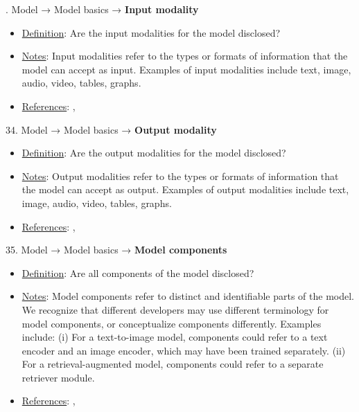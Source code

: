 . Model → Model basics → \textbf{Input modality}
\vspace{-\parskip}
\begin{itemize}
	\item
	\underline{Definition}: Are the input modalities for the model disclosed?
	\item
	\underline{Notes}: Input modalities refer to the types or formats of information that the model can accept as input. Examples of input modalities include text, image, audio, video, tables, graphs.
	\item
	\underline{References}: \citet{mitchell2019model}, \citet{crisan2022interactive}
\end{itemize} \vspace{\baselineskip}


34. Model → Model basics → \textbf{Output modality}
\vspace{-\parskip}
\begin{itemize}
	\item
	\underline{Definition}: Are the output modalities for the model disclosed?
	\item
	\underline{Notes}: Output modalities refer to the types or formats of information that the model can accept as output. Examples of output modalities include text, image, audio, video, tables, graphs.
	\item
	\underline{References}: \citet{mitchell2019model}, \citet{crisan2022interactive}
\end{itemize} \vspace{\baselineskip}


35. Model → Model basics → \textbf{Model components}
\vspace{-\parskip}
\begin{itemize}
	\item
	\underline{Definition}: Are all components of the model disclosed?
	\item
	\underline{Notes}: Model components refer to distinct and identifiable parts of the model. We recognize that different developers may use different terminology for model components, or conceptualize components differently. Examples include: (i) For a text-to-image model, components could refer to a text encoder and an image encoder, which may have been trained separately. (ii) For a retrieval-augmented model, components could refer to a separate retriever module.
	\item
	\underline{References}: \citet{mitchell2019model}, \citet{crisan2022interactive}
\end{itemize} \vspace{\baselineskip}


